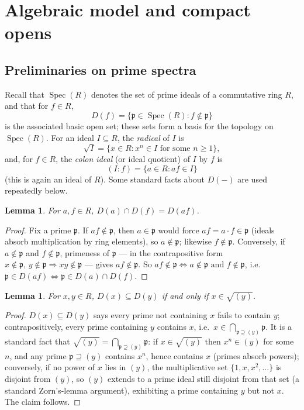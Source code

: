 \documentclass{amsart}
\newtheorem{lemma}[theorem]{Lemma}
\theoremstyle{definition}
\theoremstyle{remark}
\newcommand{\Spec}[1]{\operatorname{Spec}\left(#1\right)}
\begin{document}
\section{Algebraic model and compact opens}

\subsection*{Preliminaries on prime spectra}

Recall that $\Spec{R}$ denotes the set of prime ideals of a commutative
ring $R$, and that for $f\in R$,
\[
D(f)=\{\mathfrak p\in\Spec{R}:f\notin\mathfrak p\}
\]
is the associated basic open set; these sets form a basis for the
topology on $\Spec{R}$. For an ideal $I\subseteq R$, the \emph{radical}
of $I$ is
\[
\sqrt I=\{x\in R:x^n\in I\text{ for some }n\geq1\},
\]
and, for $f\in R$, the \emph{colon ideal} (or ideal quotient) of $I$ by
$f$ is
\[
(I:f)=\{a\in R:af\in I\}
\]
(this is again an ideal of $R$). Some standard facts about $D(-)$ are used
repeatedly below.

\begin{lemma}\label{lem:D-intersection}
For $a,f\in R$, $D(a)\cap D(f)=D(af)$.
\end{lemma}

\begin{proof}
Fix a prime $\mathfrak p$. If $af\notin\mathfrak p$, then $a\in\mathfrak
p$ would force $af=a\cdot f\in\mathfrak p$ (ideals absorb multiplication
by ring elements), so $a\notin\mathfrak p$; likewise $f\notin\mathfrak
p$. Conversely, if $a\notin\mathfrak p$ and $f\notin\mathfrak p$,
primeness of $\mathfrak p$ --- in the contrapositive form $x\notin
\mathfrak p,\,y\notin\mathfrak p\Rightarrow xy\notin\mathfrak p$ --- gives
$af\notin\mathfrak p$. So $af\notin\mathfrak p\iff a\notin\mathfrak
p\text{ and }f\notin\mathfrak p$, i.e.\ $\mathfrak p\in D(af)\iff
\mathfrak p\in D(a)\cap D(f)$.
\end{proof}

\begin{lemma}\label{lem:D-inclusion}
For $x,y\in R$, $D(x)\subseteq D(y)$ if and only if $x\in\sqrt{(y)}$.
\end{lemma}

\begin{proof}
$D(x)\subseteq D(y)$ says every prime not containing $x$ fails to
contain $y$; contrapositively, every prime containing $y$ contains $x$,
i.e.\ $x\in\bigcap_{\mathfrak p\supseteq(y)}\mathfrak p$. It is a
standard fact that $\sqrt{(y)}=\bigcap_{\mathfrak p\supseteq(y)}\mathfrak
p$: if $x\in\sqrt{(y)}$ then $x^n\in(y)$ for some $n$, and any prime
$\mathfrak p\supseteq(y)$ contains $x^n$, hence contains $x$ (primes
absorb powers); conversely, if no power of $x$ lies in $(y)$, the
multiplicative set $\{1,x,x^2,\dots\}$ is disjoint from $(y)$, so $(y)$
extends to a prime ideal still disjoint from that set (a standard
Zorn's-lemma argument), exhibiting a prime containing $y$ but not $x$.
The claim follows.
\end{proof}
\end{document}
